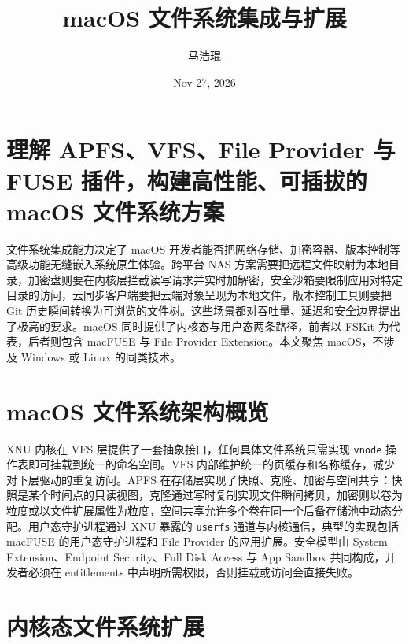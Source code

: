 \title{macOS 文件系统集成与扩展}
\author{马浩琨}
\date{Nov 27, 2026}
\maketitle
\chapter{理解 APFS、VFS、File Provider 与 FUSE 插件，构建高性能、可插拔的 macOS 文件系统方案}
文件系统集成能力决定了 macOS 开发者能否把网络存储、加密容器、版本控制等高级功能无缝嵌入系统原生体验。跨平台 NAS 方案需要把远程文件映射为本地目录，加密盘则要在内核层拦截读写请求并实时加解密，安全沙箱要限制应用对特定目录的访问，云同步客户端要把云端对象呈现为本地文件，版本控制工具则要把 Git 历史瞬间转换为可浏览的文件树。这些场景都对吞吐量、延迟和安全边界提出了极高的要求。macOS 同时提供了内核态与用户态两条路径，前者以 FSKit 为代表，后者则包含 macFUSE 与 File Provider Extension。本文聚焦 macOS，不涉及 Windows 或 Linux 的同类技术。\par
\chapter{macOS 文件系统架构概览}
XNU 内核在 VFS 层提供了一套抽象接口，任何具体文件系统只需实现 \texttt{vnode} 操作表即可挂载到统一的命名空间。VFS 内部维护统一的页缓存和名称缓存，减少对下层驱动的重复访问。APFS 在存储层实现了快照、克隆、加密与空间共享：快照是某个时间点的只读视图，克隆通过写时复制实现文件瞬间拷贝，加密则以卷为粒度或以文件扩展属性为粒度，空间共享允许多个卷在同一个后备存储池中动态分配。用户态守护进程通过 XNU 暴露的 \texttt{userfs} 通道与内核通信，典型的实现包括 macFUSE 的用户态守护进程和 File Provider 的应用扩展。安全模型由 System Extension、Endpoint Security、Full Disk Access 与 App Sandbox 共同构成，开发者必须在 entitlements 中声明所需权限，否则挂载或访问会直接失败。\par
\chapter{内核态文件系统扩展}
